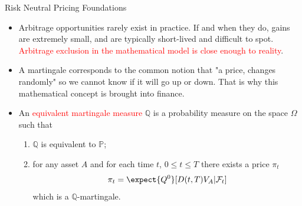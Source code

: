 \documentclass{beamer}
\begin{document}
\begin{frame}{Risk Neutral Pricing Foundations}
\begin{itemize}
	\item Arbitrage opportunities rarely exist in practice. If and when they do, gains are extremely small, and are typically short-lived and difficult to spot. \textcolor{red}{Arbitrage exclusion in the mathematical model is close enough to reality}.
	\item A martingale corresponds to the common notion that "a price, changes randomly" so we cannot know if it will go up or down. That is why this mathematical concept is brought into finance.
	\item An \textcolor{red}{equivalent martingale measure} $\mathbb{Q}$ is a probability measure on the space $\Omega$ such that
	\begin{enumerate}
		\item $\mathbb{Q}$ is equivalent to $\mathbb{P}$;
		\item for any asset $A$ and for each time $t$, $0\le t\le T$ there exists a price $\pi_t$
		\begin{equation*}
			\pi_t = \expect{Q^0}[D(t,T)V_A|\mathcal{F}_t]
		\end{equation*}
		which is a $\mathbb{Q}$-martingale.
	\end{enumerate}
\end{itemize}
\end{frame}

\end{document}

